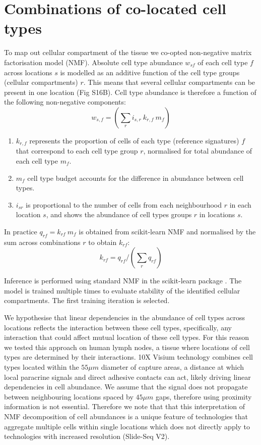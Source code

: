 \documentclass[11pt,a4paper]{article}
\begin{document}
\section{Combinations of co-located cell types} \label{cell_neighbourhoods}

To map out cellular compartment of the tissue we co-opted non-negative matrix factorisation model (NMF). Absolute cell type abundance $w_{sf}$ of each cell type $f$ across locations $s$ is modelled as an additive function of the cell type groups (cellular compartments) $r$. This means that several cellular compartments can be present in one location (Fig S16B). Cell type abundance is therefore a function of the following non-negative components:  
\begin{equation} \label{eq:circ:1}
w_{s,f} = (\sum_{r} {i_{s,r} \: k_{r,f} \: m_{f}})
\end{equation}

\begin{enumerate}
    \item $k_{r,f}$ represents the proportion of cells of each type (reference signatures) $f$ that correspond to each cell type group $r$, normalised for total abundance of each cell type $m_{f}$.
    \item $m_{f}$ cell type budget accounts for the difference in abundance between cell types.
    \item $i_{sr}$ is proportional to the number of cells from each neighbourhood $r$ in each location $s$, and shows the abundance of cell types groups $r$ in locations $s$.
\end{enumerate}

In practice $q_{rf} = k_{rf} \: m_{f}$ is obtained from scikit-learn NMF and normalised by the sum across combinations $r$ to obtain $k_{rf}$:
\begin{equation} \label{eq:circ:2}
k_{rf} = q_{rf} / (\sum_{r} q_{rf})
\end{equation}

Inference is performed using standard NMF in the scikit-learn package \cite{scikit-learn}. The model is trained multiple times to evaluate stability of the identified cellular compartments. The first training iteration is selected. 

We hypothesise that linear dependencies in the abundance of cell types across locations reflects the interaction between these cell types, specifically, any interaction that could affect mutual location of these cell types. For this reason we tested this approach on human lymph nodes, a tissue where locations of cell types are determined by their interactions. 10X Visium technology combines cell types located within the $55\mu m$ diameter of capture areas, a distance at which local paracrine signals and direct adhesive contacts can act, likely driving linear dependencies in cell abundance. We assume that the signal does not propagate between neighbouring locations spaced by $45\mu m$ gaps, therefore using proximity information is not essential. Therefore we note that that this interpretation of NMF decomposition of cell abundances is a unique feature of technologies that aggregate multiple cells within single locations which does not directly apply to technologies with increased resolution (Slide-Seq V2).
\end{document}
